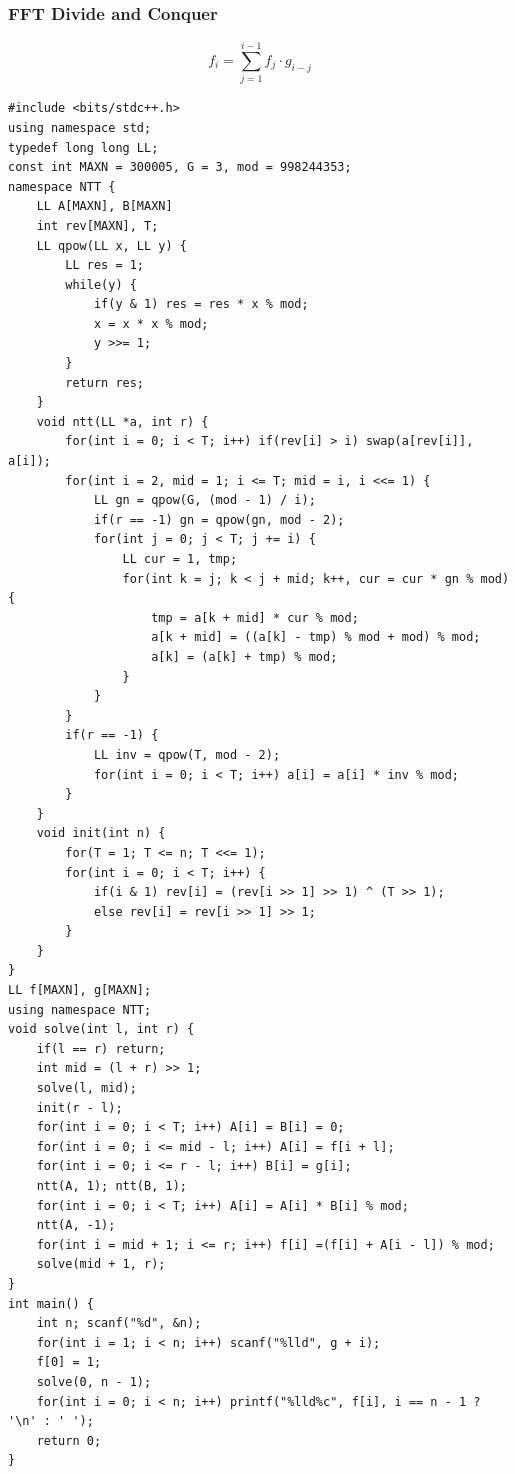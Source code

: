 \documentclass[10pt]{ctexart}
\begin{document}
{\subsubsection{FFT Divide and Conquer}
$$
f_i = \sum_{j=1}^{i-1} f_j \cdot g_{i-j}
$$
\begin{lstlisting}
#include <bits/stdc++.h>
using namespace std;
typedef long long LL;
const int MAXN = 300005, G = 3, mod = 998244353;
namespace NTT {
    LL A[MAXN], B[MAXN]
    int rev[MAXN], T;
    LL qpow(LL x, LL y) {
        LL res = 1;
        while(y) {
            if(y & 1) res = res * x % mod;
            x = x * x % mod;
            y >>= 1;
        }
        return res;
    }
    void ntt(LL *a, int r) {
        for(int i = 0; i < T; i++) if(rev[i] > i) swap(a[rev[i]], a[i]);
        for(int i = 2, mid = 1; i <= T; mid = i, i <<= 1) {
            LL gn = qpow(G, (mod - 1) / i);
            if(r == -1) gn = qpow(gn, mod - 2);
            for(int j = 0; j < T; j += i) {
                LL cur = 1, tmp;
                for(int k = j; k < j + mid; k++, cur = cur * gn % mod) {
                    tmp = a[k + mid] * cur % mod;
                    a[k + mid] = ((a[k] - tmp) % mod + mod) % mod;
                    a[k] = (a[k] + tmp) % mod;
                }
            }
        }
        if(r == -1) {
            LL inv = qpow(T, mod - 2);
            for(int i = 0; i < T; i++) a[i] = a[i] * inv % mod;
        }
    }
    void init(int n) {
        for(T = 1; T <= n; T <<= 1);
        for(int i = 0; i < T; i++) {
            if(i & 1) rev[i] = (rev[i >> 1] >> 1) ^ (T >> 1);
            else rev[i] = rev[i >> 1] >> 1;
        }
    }
}
LL f[MAXN], g[MAXN];
using namespace NTT;
void solve(int l, int r) {
    if(l == r) return;
    int mid = (l + r) >> 1;
    solve(l, mid);
    init(r - l);
    for(int i = 0; i < T; i++) A[i] = B[i] = 0;
    for(int i = 0; i <= mid - l; i++) A[i] = f[i + l];
    for(int i = 0; i <= r - l; i++) B[i] = g[i];
    ntt(A, 1); ntt(B, 1);
    for(int i = 0; i < T; i++) A[i] = A[i] * B[i] % mod;
    ntt(A, -1);
    for(int i = mid + 1; i <= r; i++) f[i] =(f[i] + A[i - l]) % mod;
    solve(mid + 1, r);
}
int main() {
    int n; scanf("%d", &n);
    for(int i = 1; i < n; i++) scanf("%lld", g + i); 
    f[0] = 1;
    solve(0, n - 1);
    for(int i = 0; i < n; i++) printf("%lld%c", f[i], i == n - 1 ? '\n' : ' ');
    return 0;
}
\end{lstlisting}
}
\end{document}
